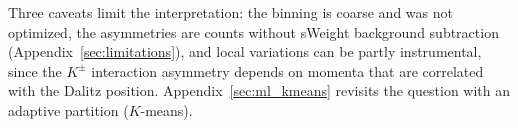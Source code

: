 Three caveats limit the interpretation: the binning is coarse and was not optimized, the asymmetries are counts without sWeight background subtraction (Appendix~\ref{sec:limitations}), and local variations can be partly instrumental, since the $K^\pm$ interaction asymmetry depends on momenta that are correlated with the Dalitz position. Appendix~\ref{sec:ml_kmeans} revisits the question with an adaptive partition ($K$-means).




